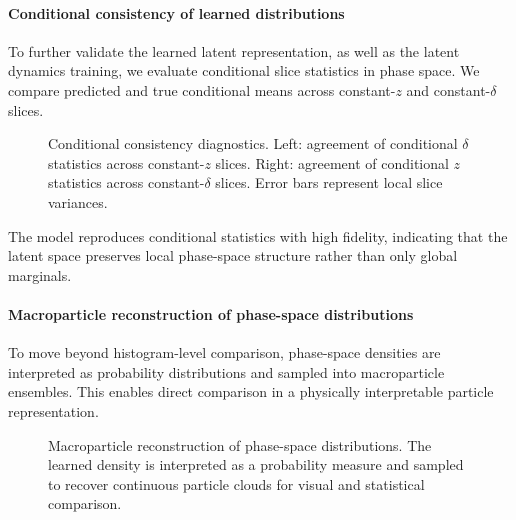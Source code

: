 \documentclass[11pt,a4paper]{article}
\begin{document}
\begin{sloppypar}
\paragraph{Conditional consistency of learned distributions}

To further validate the learned latent representation, as well as the latent dynamics training, we evaluate conditional slice statistics in phase space. We compare predicted and true conditional means across constant-$z$ and constant-$\delta$ slices.

\begin{figure}[H]
\centering
\caption{\small Conditional consistency diagnostics. Left: agreement of conditional $\delta$ statistics across constant-$z$ slices. Right: agreement of conditional $z$ statistics across constant-$\delta$ slices. Error bars represent local slice variances.}
\label{fig:conditional_slices}
\end{figure}

The model reproduces conditional statistics with high fidelity, indicating that the latent space preserves local phase-space structure rather than only global marginals.

\paragraph{Macroparticle reconstruction of phase-space distributions}

To move beyond histogram-level comparison, phase-space densities are interpreted as probability distributions and sampled into macroparticle ensembles. This enables direct comparison in a physically interpretable particle representation.

\begin{figure}[H]
\centering
\caption{\small Macroparticle reconstruction of phase-space distributions. The learned density is interpreted as a probability measure and sampled to recover continuous particle clouds for visual and statistical comparison.}
\label{fig:macroparticles}
\end{figure}


\end{sloppypar}
\end{document}
